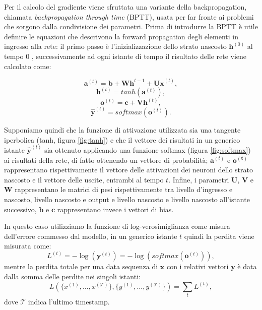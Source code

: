 \documentclass[../../main.tex]{subfiles}
\begin{document}
Per il calcolo del gradiente viene sfruttata una variante della  backpropagation, chiamata \textit{backpropagation through time} (BPTT), usata per far fronte ai problemi che sorgono dalla condivisione dei parametri. Prima di introdurre la BPTT è utile definire le equazioni che descrivono la forward propagation degli elementi in ingresso alla rete: il primo passo è l'inizializzazione dello strato nascosto $\boldsymbol{h}^{(0)}$ al tempo 0 , successivamente ad ogni istante di tempo il risultato delle rete viene calcolato come:
\begin{fleqn}[1cm]
    \begin{equation}
        \boldsymbol{a}^{(t)} = \boldsymbol{b} + \boldsymbol{W h}^{t-1} + \boldsymbol{U x}^{(t)},
    \end{equation}
    \begin{equation}
        \boldsymbol{h}^{(t)} = tanh(\boldsymbol{a}^{(t)}),
    \end{equation}
    \begin{equation}
        \boldsymbol{o}^{(t)} = \boldsymbol{c} + \boldsymbol{V h}^{(t)},
    \end{equation}
    \begin{equation}
        \boldsymbol{\hat{y}}^{(t)} = softmax(\boldsymbol{o}^{(t)}).
    \end{equation}
\end{fleqn}
Supponiamo quindi che la funzione di attivazione utilizzata sia una tangente iperbolica (tanh, figura \ref{fig:tanh}) e che il vettore dei risultati in un generico istante $\boldsymbol{\hat{y}}^{(t)}$ sia ottenuto applicando una funzione softmax (figura \ref{fig:softmax}) ai risultati della rete, di fatto ottenendo un vettore di probabilità; $\boldsymbol{a}^{(t)}$ e $\boldsymbol{o^{(t)}}$ rappresentano rispettivamente il vettore delle attivazioni dei neuroni dello strato nascosto e il vettore delle uscite, entrambi al tempo $t$. Infine, i parametri $\boldsymbol{U}$, $\boldsymbol{V}$ e $\boldsymbol{W}$ rappresentano le matrici di pesi rispettivamente tra livello d'ingresso e nascosto, livello nascosto e output e livello nascosto e livello nascosto all'istante successivo, $\boldsymbol{b}$ e $\boldsymbol{c}$ rappresentano invece i vettori di bias.

In questo caso utilizziamo la funzione di log-verosimiglianza come misura dell'errore commesso dal modello, in un generico istante $t$ quindi la perdita viene misurata come:
\[L^{(t)} = -\log(\boldsymbol{y}^{(t)}) = -\log(softmax(\boldsymbol{o}^{(t)})),\]
mentre la perdita totale per una data sequenza di $\boldsymbol{x}$ con i relativi vettori $\boldsymbol{y}$ è data dalla somma delle perdite nei singoli istanti:
\[L(\{x^{(1)}, \dots, x^{(\mathcal{T})}\}, \{y^{(1)}, \dots, y^{(\mathcal{T})}\}) = \sum_t L^{(t)},\]
dove $\mathcal{T}$ indica l'ultimo timestamp.
\end{document}
